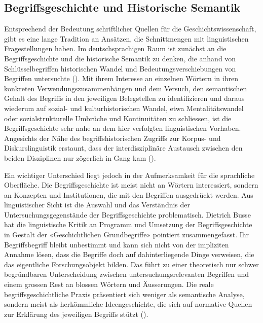 \subsection{Begriffsgeschichte und Historische Semantik}

Entsprechend der Bedeutung schriftlicher Quellen für die Geschichtswissenschaft, gibt es eine lange Tradition an Ansätzen, die Schnittmengen mit linguistischen Fragestellungen haben. Im deutschsprachigen Raum ist zunächst an die Begriffsgeschichte und die historische Semantik zu denken, die anhand von Schlüsselbegriffen historischen Wandel und Bedeutungsverschiebungen von Begriffen untersuchte (\cite{koselleck_begriffsgeschichte_1972, koselleck_geschichtliche_1972}). Mit ihrem Interesse an einzelnen Wörtern in ihren konkreten Verwendungszusammenhängen und dem Versuch, den semantischen Gehalt des Begriffs in den jeweiligen Belegstellen zu identifizieren und daraus wiederum auf sozial- und kulturhistorischen Wandel, etwa Mentalitätswandel oder sozialstrukturelle Umbrüche und Kontinuitäten zu schliessen, ist die Begriffsgeschichte sehr nahe an dem hier verfolgten linguistischen Vorhaben. Angesichts der Nähe des begriffshistorischen Zugriffs zur Korpus- und Diskurslinguistik erstaunt, dass der interdisziplinäre Austausch zwischen den beiden Disziplinen nur zögerlich in Gang kam (\cite{busse_historische_2000}).

Ein wichtiger Unterschied liegt jedoch in der Aufmerksamkeit für die sprachliche Oberfläche. Die Begriffsgeschichte ist meist nicht an Wörtern interessiert, sondern an Konzepten und Institutionen, die mit den Begriffen ausgedrückt werden. Aus linguistischer Sicht ist die Auswahl und das Verständnis der Untersuchungsgegenstände der Begriffsgeschichte problematisch. Dietrich Busse hat die linguistische Kritik an Programm und Umsetzung der Begriffsgeschichte in Gestalt der «Geschichtlichen Grundbegriffe» pointiert zusammengefasst. Ihr Begriffsbegriff bleibt unbestimmt und kann sich nicht von der impliziten Annahme lösen, dass die Begriffe doch auf dahinterliegende Dinge verweisen, die das eigentliche Forschungsobjekt bilden. Das führt zu einer theoretisch nur schwer begründbaren Unterscheidung zwischen untersuchungsrelevanten Begriffen und einem grossen Rest an blossen Wörtern und Äusserungen. Die reale begriffsgeschichtliche Praxis präsentiert sich weniger als semantische Analyse, sondern meist als herkömmliche Ideengeschichte, die sich auf normative Quellen zur Erklärung des jeweiligen Begriffs stützt (\cite[50-71]{busse_historische_1987}). 

